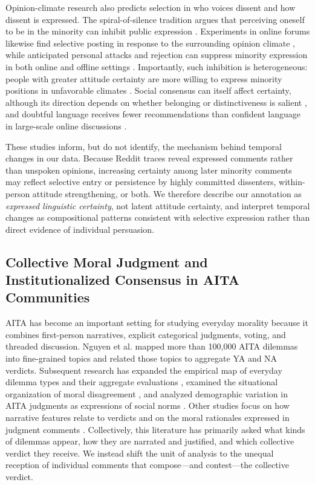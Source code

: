 Opinion-climate research also predicts selection in who voices dissent and how dissent is expressed. The spiral-of-silence tradition argues that perceiving oneself to be in the minority can inhibit public expression \cite{noelleneumann1974spiral}. Experiments in online forums likewise find selective posting in response to the surrounding opinion climate \cite{yun2011selective}, while anticipated personal attacks and rejection can suppress minority expression in both online and offline settings \cite{neubaum2018sanctions}. Importantly, such inhibition is heterogeneous: people with greater attitude certainty are more willing to express minority positions in unfavorable climates \cite{matthes2010spiral}. Social consensus can itself affect certainty, although its direction depends on whether belonging or distinctiveness is salient \cite{clarkson2013consensus}, and doubtful language receives fewer recommendations than confident language in large-scale online discussions \cite{evans2023doubt}.

These studies inform, but do not identify, the mechanism behind temporal changes in our data. Because Reddit traces reveal expressed comments rather than unspoken opinions, increasing certainty among later minority comments may reflect selective entry or persistence by highly committed dissenters, within-person attitude strengthening, or both. We therefore describe our annotation as \emph{expressed linguistic certainty}, not latent attitude certainty, and interpret temporal changes as compositional patterns consistent with selective expression rather than direct evidence of individual persuasion.

\subsection{Collective Moral Judgment and Institutionalized Consensus in AITA Communities}

AITA has become an important setting for studying everyday morality because it combines first-person narratives, explicit categorical judgments, voting, and threaded discussion. Nguyen et al. \cite{nguyen2022mapping} mapped more than 100,000 AITA dilemmas into fine-grained topics and related those topics to aggregate YA and NA verdicts. Subsequent research has expanded the empirical map of everyday dilemma types and their aggregate evaluations \cite{yudkin2025large}, examined the situational organization of moral disagreement \cite{shi2025moral}, and analyzed demographic variation in AITA judgments as expressions of social norms \cite{decandia2022socialnorms}. Other studies focus on how narrative features relate to verdicts \cite{giorgi2023author} and on the moral rationales expressed in judgment comments \cite{xi2024morality}. Collectively, this literature has primarily asked what kinds of dilemmas appear, how they are narrated and justified, and which collective verdict they receive. We instead shift the unit of analysis to the unequal reception of individual comments that compose---and contest---the collective verdict.

